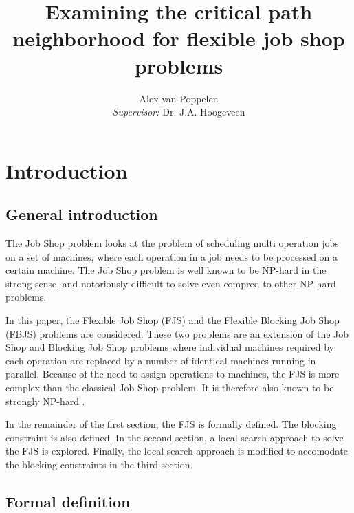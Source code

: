 \documentclass[a4paper,11pt]{article}
\title{Examining the critical path neighborhood for flexible job shop problems}
\author{Alex van Poppelen\smallskip\\
\emph{Supervisor:} Dr. J.A. Hoogeveen}
\begin{document}
\maketitle




\tableofcontents

\section{Introduction}

\subsection{General introduction}

The Job Shop problem looks at the problem of scheduling multi operation jobs on a set of machines, where each operation in a job needs to be processed on a certain machine. The Job Shop problem is well known to be NP-hard in the strong sense, and notoriously difficult to solve even compred to other NP-hard problems.

In this paper, the Flexible Job Shop (FJS) and the Flexible Blocking Job Shop (FBJS) problems are considered. These two problems are an extension of the Job Shop and Blocking Job Shop problems where individual machines required by each operation are replaced by a number of identical machines running in parallel. Because of the need to assign operations to machines, the FJS is more complex than the classical Job Shop problem. It is therefore also known to be strongly NP-hard \cite{approxfjsp}.

In the remainder of the first section, the FJS is formally defined. The blocking constraint is also defined. In the second section, a local search approach to solve the FJS is explored. Finally, the local search approach is modified to accomodate the blocking constraints in the third section.

\subsection{Formal definition}
\end{document}
